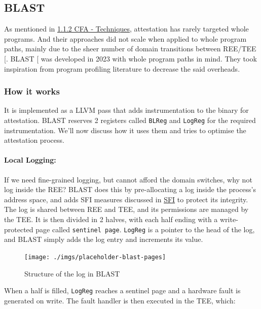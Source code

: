 \documentclass[a4paper, nobind]{templates/ociamthesis}
\begin{document}
\subsection{BLAST}\label{blast}

As mentioned in \hyperref[cfatechniques]{1.1.2 CFA - Techniques}, attestation has rarely targeted whole programs.
And their approaches did not scale when applied to whole program paths, mainly
due to the sheer number of domain transitions between REE/TEE {[}\citeproc{ref-blast}{56}{]}.
BLAST {[}\citeproc{ref-blast}{56}{]} was developed in 2023 with whole program paths in mind.
They took inspiration from program profiling literature to decrease the said overheads.

\subsubsection{How it works}\label{how-it-works}

It is implemented as a LLVM pass that adds instrumentation to the binary for attestation.
BLAST reserves 2 registers called \texttt{BLReg} and \texttt{LogReg} for the required instrumentation.
We'll now discuss how it uses them and tries to optimise the attestation process.

\paragraph{Local Logging:}\label{local-logging}

If we need fine-grained logging, but cannot afford the domain switches, why not log inside the REE?
BLAST does this by pre-allocating a log inside the process's address space,
and adds SFI measures discussed in \hyperref[blastsfi]{SFI} to protect its integrity.
The log is shared between REE and TEE, and its permissions are managed by the TEE.
It is then divided in 2 halves, with each half ending with a write-protected page called \texttt{sentinel\ page}.
\texttt{LogReg} is a pointer to the head of the log, and BLAST simply adds the log entry
and increments its value.

\begin{figure}[H]

{\centering \texttt{[image: ./imgs/placeholder-blast-pages]} 

}

\caption{Structure of the log in BLAST}\label{fig:blast-log-pages}
\end{figure}

When a half is filled, \texttt{LogReg} reaches a sentinel page and a hardware fault is generated on write.
The fault handler is then executed in the TEE, which:
\end{document}
